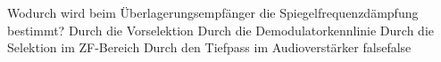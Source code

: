     {Wodurch wird beim Überlagerungsempfänger die Spiegelfrequenzdämpfung bestimmt?}
    {Durch die Vorselektion}
    {Durch die Demodulatorkennlinie}
    {Durch die Selektion im ZF-Bereich}
    {Durch den Tiefpass im Audioverstärker}
    {false}{false}